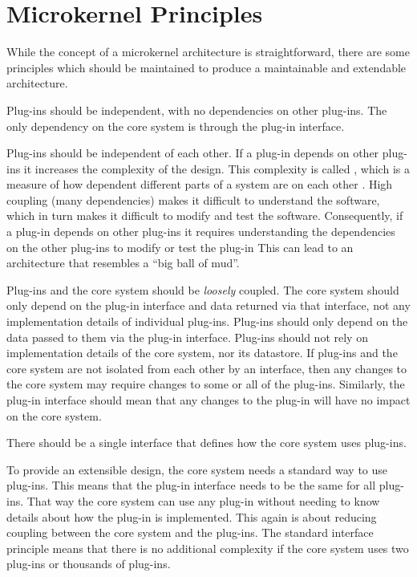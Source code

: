 \section{Microkernel Principles}
While the concept of a microkernel architecture is straightforward,
there are some principles which should be maintained to produce a maintainable and extendable architecture.

\begin{definition}\label{independent-plug-in}
    Plug-ins should be independent, with no dependencies on other plug-ins.
    The only dependency on the core system is through the plug-in interface.
\end{definition}

Plug-ins should be independent of each other.
If a plug-in depends on other plug-ins it increases the complexity of the design.
This complexity is called ,
which is a measure of how dependent different parts of a system are on each other \cite{glossary-architecture}.
High coupling (many dependencies) makes it difficult to understand the software,
which in turn makes it difficult to modify and test the software.
Consequently, if a plug-in depends on other plug-ins it requires understanding the dependencies on the other plug-ins to modify or test the plug-in
This can lead to an architecture that resembles a ``big ball of mud''.

Plug-ins and the core system should be \emph{loosely} coupled.
The core system should only depend on the plug-in interface and data returned via that interface, not any implementation details of individual plug-ins.
Plug-ins should only depend on the data passed to them via the plug-in interface.
Plug-ins should not rely on implementation details of the core system, nor its datastore.
If plug-ins and the core system are not isolated from each other by an interface,
then any changes to the core system may require changes to some or all of the plug-ins.
Similarly, the plug-in interface should mean that any changes to the plug-in will have no impact on the core system.

\vspace{1mm}
\begin{definition}\label{std-intf}
    There should be a single interface that defines how the core system uses plug-ins.
\end{definition}

To provide an extensible design, the core system needs a standard way to use plug-ins.
This means that the plug-in interface needs to be the same for all plug-ins.
That way the core system can use any plug-in without needing to know details about how the plug-in is implemented.
This again is about reducing coupling between the core system and the plug-ins.
The standard interface principle means that there is no additional complexity if the core system uses two plug-ins or thousands of plug-ins.


